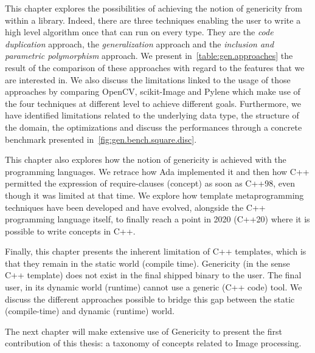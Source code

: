 This chapter explores the possibilities of achieving the notion of genericity from within a library. Indeed, there are
three techniques enabling the user to write a high level algorithm once that can run on every type. They are the
\emph{code duplication} approach, the \emph{generalization} approach and the \emph{inclusion and parametric
  polymorphism} approach. We present in~\cref{table:gen.approaches} the result of the comparison of these approaches with
regard to the features that we are interested in. We also discuss the limitations linked to the usage of those
approaches by comparing OpenCV, scikit-Image and Pylene which make use of the four techniques at different level to
achieve different goals. Furthermore, we have identified limitations related to the underlying data type, the structure of the
domain, the optimizations and discuss the performances through a concrete benchmark presented
in~\cref{fig:gen.bench.square.disc}.

This chapter also explores how the notion of genericity is achieved with the programming languages. We retrace how Ada
implemented it and then how C++ permitted the expression of require-clauses (concept) as soon as C++98, even though it
was limited at that time. We explore how template metaprogramming techniques have been developed and have evolved,
alongside the C++ programming language itself, to finally reach a point in 2020 (C++20) where it is possible to write
concepts in C++.

Finally, this chapter presents the inherent limitation of C++ templates, which is that they remain in the static world
(compile time). Genericity (in the sense C++ template) does not exist in the final shipped binary to the user. The final
user, in its dynamic world (runtime) cannot use a generic (C++ code) tool. We discuss the different approaches possible
to bridge this gap between the static (compile-time) and dynamic (runtime) world.

The next chapter will make extensive use of Genericity to present the first contribution of this thesis: a taxonomy of
concepts related to Image processing.
